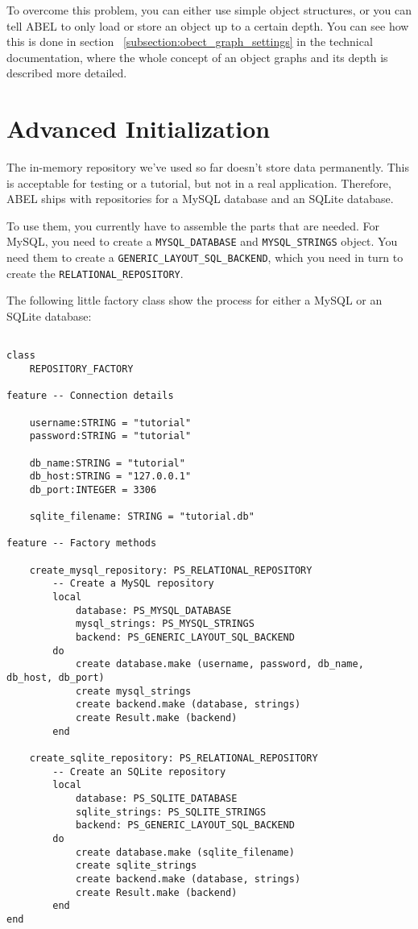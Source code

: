 To overcome this problem, you can either use simple object structures, or you can tell ABEL to only load or store an object up to a certain depth.
You can see how this is done in section ~\ref{subsection:obect_graph_settings} in the technical documentation, where the whole concept of an object graphs and its depth is described more detailed.



\section{Advanced Initialization}
\label{section:advanced_initialization}

The in-memory repository we've used so far doesn't store data permanently.
This is acceptable for testing or a tutorial, but not in a real application.
Therefore, ABEL ships with repositories for a MySQL database and an SQLite database.

To use them, you currently have to assemble the parts that are needed.
For MySQL, you need to create a \lstinline!MYSQL_DATABASE! and \lstinline!MYSQL_STRINGS! object.
You need them to create a \lstinline!GENERIC_LAYOUT_SQL_BACKEND!, which you need in turn to create the \lstinline!RELATIONAL_REPOSITORY!.

The following little factory class show the process for either a MySQL or an SQLite \cite{SQLite} database:

\begin{lstlisting}[language=OOSC2Eiffel, captionpos=b, caption={}, label={lst:advanced_initialization}]

class 
	REPOSITORY_FACTORY

feature -- Connection details
	
	username:STRING = "tutorial"
	password:STRING = "tutorial"

	db_name:STRING = "tutorial"
	db_host:STRING = "127.0.0.1"
	db_port:INTEGER = 3306

	sqlite_filename: STRING = "tutorial.db"

feature -- Factory methods

	create_mysql_repository: PS_RELATIONAL_REPOSITORY
		-- Create a MySQL repository
		local
			database: PS_MYSQL_DATABASE
			mysql_strings: PS_MYSQL_STRINGS
			backend: PS_GENERIC_LAYOUT_SQL_BACKEND
		do
			create database.make (username, password, db_name, db_host, db_port)
			create mysql_strings
			create backend.make (database, strings)
			create Result.make (backend)
		end

	create_sqlite_repository: PS_RELATIONAL_REPOSITORY
		-- Create an SQLite repository
		local
			database: PS_SQLITE_DATABASE
			sqlite_strings: PS_SQLITE_STRINGS
			backend: PS_GENERIC_LAYOUT_SQL_BACKEND
		do
			create database.make (sqlite_filename)
			create sqlite_strings
			create backend.make (database, strings)
			create Result.make (backend)
		end
end	

\end{lstlisting}

